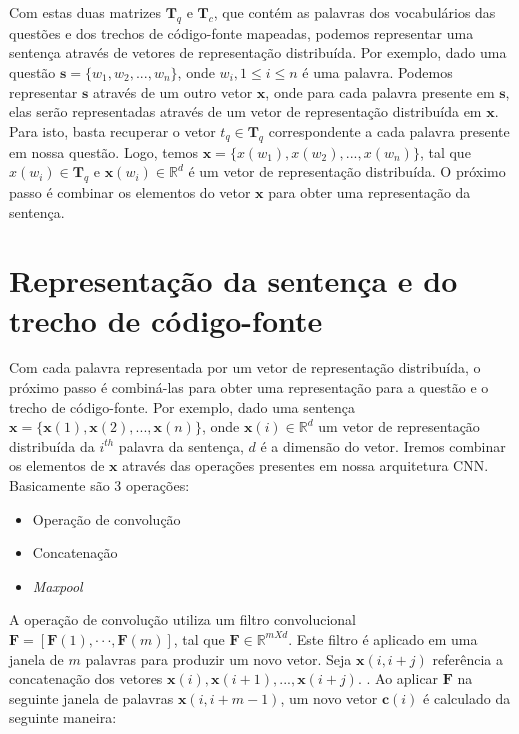 Com estas duas matrizes $\bm{T}_{q}$ e $\bm{T}_{c}$, que contém as palavras dos vocabulários das questões e dos trechos de código-fonte mapeadas, podemos representar uma sentença através de vetores de representação distribuída. Por exemplo, dado uma questão $\bm{s} = \{ w_{1}, w_{2}, . . ., w_{n}\}$, onde $w_{i}, 1 \leq i \leq n$ é uma palavra. Podemos representar $\bm{s}$ através de um outro vetor $\bm{x}$, onde para cada palavra presente em $\bm{s}$, elas serão representadas através de um vetor de representação distribuída em $\bm{x}$. Para isto, basta recuperar o vetor $t_{q} \in \bm{T}_{q}$ correspondente a cada palavra presente em nossa questão. Logo, temos $\bm{x} = \{ x(w_{1}), x(w_{2}), . . ., x(w_{n})\}$, tal que $x(w_{i}) \in \bm{T}_{q}$ e $\bm{x}(w_{i}) \in \mathbb{R}^{d}$ é um vetor de representação distribuída. O próximo passo é combinar os elementos do vetor $\bm{x}$ para obter uma representação da sentença.





\section{Representação da sentença e do trecho de código-fonte}
\label{sec:representacao-sentenca}

Com cada palavra representada por um vetor de representação distribuída, o próximo passo é combiná-las para obter uma representação para a questão e o trecho de código-fonte. Por exemplo, dado uma sentença $\bm{x} = \{ \bm{x}(1), \bm{x}(2), . . ., \bm{x}(n) \}$, onde $\bm{x}(i) \in \mathbb{R}^{d}$ um vetor de representação distribuída da $i^{th}$ palavra da sentença, $d$ é a dimensão do vetor. Iremos combinar os elementos de $\bm{x}$ através das operações presentes em nossa arquitetura CNN. Basicamente são 3 operações:

\begin{itemize}
    \item Operação de convolução
    \item Concatenação
    \item \textit{Maxpool}
\end{itemize}

A operação de convolução utiliza um filtro convolucional $\bm{F}  = [\bm{F}(1),· · ·, \bm{F}(m)]$, tal que $\bm{F} \in \mathbb{R}^{m X d}$. Este filtro é aplicado em uma janela de $m$ palavras para produzir um novo vetor.
Seja $\bm{x}(i, i + j)$ referência a concatenação dos vetores $\bm{x}(i), \bm{x}(i + 1), . . ., \bm{x}(i + j)$. . Ao aplicar $\bm{F}$ na seguinte janela de palavras $\bm{x}(i, i + m - 1)$, um novo vetor $\bm{c}(i)$ é calculado da seguinte maneira:

